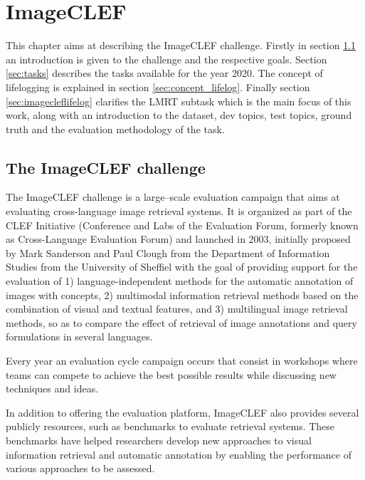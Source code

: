 \cleardoublepage

\chapter{ImageCLEF}
\label{ch:imageclef}

This chapter aims at describing the ImageCLEF challenge. Firstly in section \ref{sec:introduct} an introduction is given to the challenge and the respective goals. Section \ref{sec:tasks} describes the tasks available for the year 2020. The concept of lifelogging is explained in section \ref{sec:concept_lifelog}. Finally section \ref{sec:imagecleflifelog} clarifies the LMRT subtask which is the main focus of this work, along with an introduction to the dataset, dev topics, test topics, ground truth and the evaluation methodology of the task.



\section{The ImageCLEF challenge}
\label{sec:introduct}

The ImageCLEF challenge is a large–scale evaluation campaign that aims at evaluating cross-language image retrieval systems. It is organized as part of the CLEF Initiative (Conference and Labs of the Evaluation Forum, formerly known as Cross-Language Evaluation Forum) and launched in  2003, initially proposed by Mark Sanderson and Paul Clough from the Department of Information Studies from the University of Sheffiel with the goal of providing support for the evaluation of 1) language-independent methods for the automatic annotation of images with concepts, 2) multimodal information retrieval methods based on the combination of visual and textual features, and 3) multilingual image retrieval methods, so as to compare the effect of retrieval of image annotations and query formulations in several languages.


Every year an evaluation cycle campaign occurs that consist in workshops where teams can compete to achieve the best possible results while discussing new techniques and ideas. 

In addition to offering the evaluation platform, ImageCLEF also provides several publicly resources, such as benchmarks to evaluate retrieval systems. These benchmarks have helped researchers develop new approaches to visual information retrieval and automatic annotation by enabling the performance of various approaches to be assessed.

